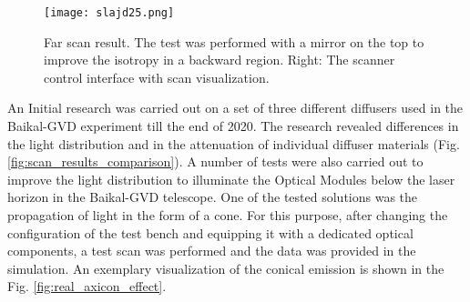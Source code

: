 \documentclass[a4paper,11pt]{article}
\begin{document}
\begin{figure}[H]
	\vspace*{-2ex}
	\centering
	\texttt{[image: slajd25.png]}
	\vspace*{-4ex}
	\caption{Far scan result. The test was performed with a mirror on the top to improve the isotropy in a backward region. Right: The scanner control interface with scan visualization.}
	\label{fig:white_diffuser_scan_bench}
	\vspace*{-2ex}
\end{figure}


An Initial research was carried out on a set of three different diffusers used in the Baikal-GVD experiment till the end of 2020. 
The research revealed differences in the light distribution and in the attenuation of individual diffuser materials (Fig. \ref{fig:scan_results_comparison}). A number of tests were also carried out to improve the light distribution to illuminate the Optical Modules below the laser horizon in the Baikal-GVD telescope.
One of the tested solutions was the propagation of light in the form of a cone. For this purpose, after changing the configuration of the test bench and equipping it with a dedicated optical components, a test scan was performed and the data was provided in the simulation. An exemplary visualization of the conical emission is shown in the Fig. \ref{fig:real_axicon_effect}.
\end{document}
